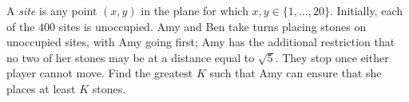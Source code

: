 A \emph{site} is any point $(x,y)$ in the plane
for which $x,y \in \{1, \dots, 20\}$.
Initially, each of the $400$ sites is unoccupied.
Amy and Ben take turns placing stones on unoccupied sites,
with Amy going first;
Amy has the additional restriction that no two of her stones
may be at a distance equal to $\sqrt5$.
They stop once either player cannot move.
Find the greatest $K$ such that Amy can ensure that
she places at least $K$ stones.